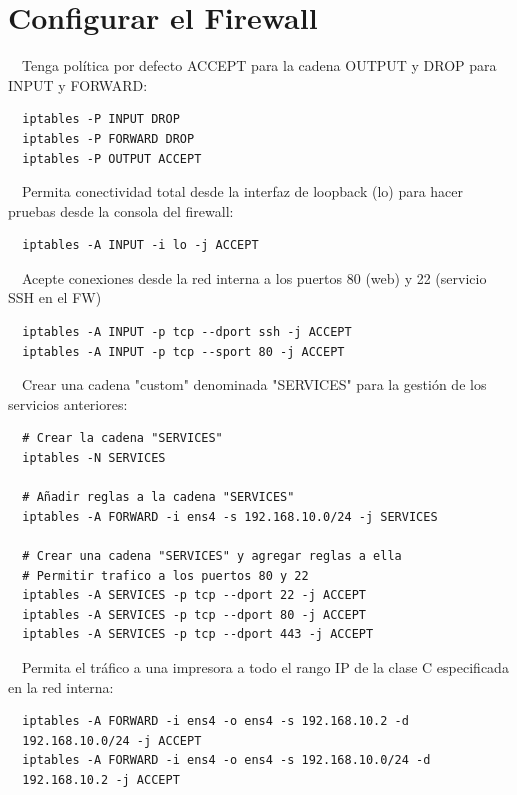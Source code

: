 \documentclass{report}
\begin{document}
  \chapter{Configurar el Firewall}
  \CIRCLE \ \ Tenga política por defecto ACCEPT para la cadena OUTPUT y DROP para INPUT y FORWARD:
  
  \begin{verbatim}
  iptables -P INPUT DROP
  iptables -P FORWARD DROP
  iptables -P OUTPUT ACCEPT
  \end{verbatim}

  \CIRCLE \ \ Permita conectividad total desde la interfaz de loopback (lo) para hacer pruebas desde la consola del firewall:
  
  \begin{verbatim}
  iptables -A INPUT -i lo -j ACCEPT
  \end{verbatim}

  \CIRCLE \ \ Acepte conexiones desde la red interna a los puertos 80 (web) y 22 (servicio SSH en el FW)

  \begin{verbatim}
  iptables -A INPUT -p tcp --dport ssh -j ACCEPT
  iptables -A INPUT -p tcp --sport 80 -j ACCEPT
  \end{verbatim}

  \CIRCLE \ \ Crear una cadena "custom" denominada "SERVICES" para la gestión de los servicios anteriores:

  \begin{verbatim}
  # Crear la cadena "SERVICES"
  iptables -N SERVICES

  # Añadir reglas a la cadena "SERVICES"
  iptables -A FORWARD -i ens4 -s 192.168.10.0/24 -j SERVICES

  # Crear una cadena "SERVICES" y agregar reglas a ella
  # Permitir trafico a los puertos 80 y 22
  iptables -A SERVICES -p tcp --dport 22 -j ACCEPT
  iptables -A SERVICES -p tcp --dport 80 -j ACCEPT
  iptables -A SERVICES -p tcp --dport 443 -j ACCEPT
  \end{verbatim}

  \CIRCLE \ \ Permita el tráfico a una impresora a todo el rango IP de la clase C especificada en la red interna:

  \begin{verbatim}
  iptables -A FORWARD -i ens4 -o ens4 -s 192.168.10.2 -d
  192.168.10.0/24 -j ACCEPT
  iptables -A FORWARD -i ens4 -o ens4 -s 192.168.10.0/24 -d
  192.168.10.2 -j ACCEPT
  \end{verbatim}
\end{document}
